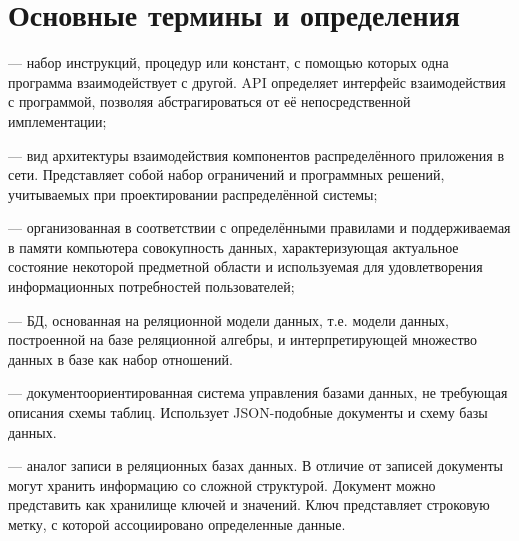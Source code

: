 \documentclass[12pt]{article}
\begin{document}
    \makeTitlePage

    \tableofcontents
    \newpage



    \section{Основные термины и определения}
     --- набор инструкций, процедур или констант,
    с помощью которых одна программа взаимодействует с другой. API определяет интерфейс взаимодействия с программой,
    позволяя абстрагироваться от её непосредственной имплементации\cite{API};

     --– вид архитектуры взаимодействия компонентов распределённого приложения в сети.
    Представляет собой набор ограничений и программных решений, учитываемых при проектировании распределённой системы\cite{RestApiTutorial};

     --– организованная в соответствии с определёнными правилами и поддерживаемая в памяти компьютера
    совокупность данных, характеризующая актуальное состояние некоторой предметной области и используемая для
    удовлетворения информационных потребностей пользователей\cite{BD_enc};

     --- БД, основанная на реляционной модели данных, т.е. модели данных, построенной на базе реляционной алгебры, и
    интерпретирующей множество данных в базе как набор отношений.

     --- документоориентированная система управления базами данных, не требующая описания схемы таблиц.
    Использует JSON-подобные документы и схему базы данных\cite{MDBIntro}.

     --- аналог записи в реляционных базах данных. В отличие от записей документы могут хранить информацию со сложной структурой.
    Документ можно представить как хранилище ключей и значений. Ключ представляет строковую метку, с которой ассоциировано определенные данные\cite{MDBIntro}.
\end{document}
